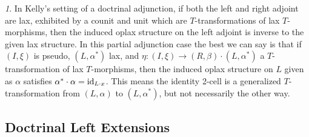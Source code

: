 \documentclass[a4paper,oneside,english]{amsart}
\numberwithin{equation}{section}
\numberwithin{figure}{section}
\theoremstyle{plain}
\theoremstyle{definition}
\theoremstyle{remark}
\newtheorem{rem}[thm]{\protect\remarkname}
\theoremstyle{definition}
\theoremstyle{plain}
\theoremstyle{plain}
\theoremstyle{plain}
\providecommand{\remarkname}{Remark}
\begin{document}
\begin{rem}
In Kelly's setting of a doctrinal adjunction, if both the left and
right adjoint are lax, exhibited by a counit and unit which are $T$-transformations
of lax $T$-morphisms, then the induced oplax structure on the left
adjoint is inverse to the given lax structure. In this partial adjunction
case the best we can say is that if $\left(I,\xi\right)$ is pseudo,
$\left(L,\alpha^{\ast}\right)$ lax, and $\eta\colon\left(I,\xi\right)\to\left(R,\beta\right)\cdot\left(L,\alpha^{\ast}\right)$
a $T$-transformation of lax $T$-morphisms, then the induced oplax
structure on $L$ given as $\alpha$ satisfies $\alpha^{\ast}\cdot\alpha=\textnormal{id}_{L\cdot x}$.
This means the identity 2-cell is a generalized $T$-transformation
from $\left(L,\alpha\right)$ to $\left(L,\alpha^{*}\right)$, but
not necessarily the other way.
\end{rem}

\subsection{Doctrinal Left Extensions\label{doctrinalleftextensions}}
\end{document}
